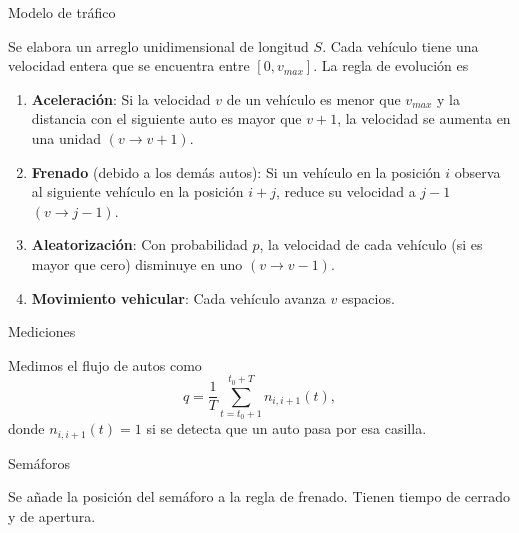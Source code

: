 \documentclass[final]{beamer}
\newlength{\onecolwid}
\newlength{\twocolwid}
\begin{document}
\begin{frame}[t]
\begin{columns}[t]
\begin{column}{\twocolwid}
\begin{columns}[t,totalwidth=\twocolwid]
\begin{column}{\onecolwid}
\begin{block}{Modelo de tráfico}

Se elabora un arreglo unidimensional de longitud $S$. Cada vehículo tiene una velocidad entera que se encuentra entre $[0,v_{max}]$. La regla de evolución es
\begin{enumerate}

\item \textbf{Aceleración}: Si la velocidad $v$ de un vehículo es menor que $v_{max}$ y la distancia con el siguiente auto es mayor que $v+1$, la velocidad se aumenta en una unidad $(v \to v+1)$.

\item \textbf{Frenado} (debido a los demás autos): Si un vehículo en la posición $i$ observa al siguiente vehículo en la posición $i+j$, reduce su velocidad a $j-1$ $(v\to j-1)$.

\item \textbf{Aleatorización}: Con probabilidad $p$, la velocidad de cada vehículo (si es mayor que cero) disminuye en uno $(v\to v-1)$.

\item \textbf{Movimiento vehicular}: Cada vehículo avanza $v$ espacios.

\end{enumerate}

\end{block}

\begin{block}{Mediciones}

Medimos el flujo de autos como
\[
	q = \frac{1}{T} \sum_{t = t_0+1}^{t_0 + T} n_{i,i+1} (t),
\]
donde $n_{i,i+1} (t) = 1$ si se detecta que un auto pasa por esa casilla.

\end{block}

\begin{block}{Semáforos}

Se añade la posición del semáforo a la regla de frenado. Tienen tiempo de cerrado y de apertura.


\end{block}
\end{column}
\end{columns}
\end{column}
\end{columns}
\end{frame}
\end{document}
